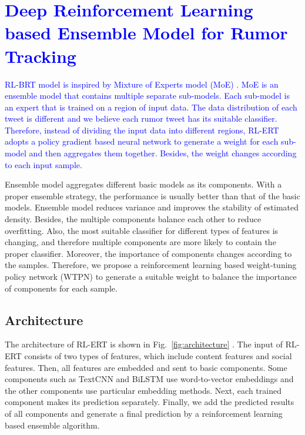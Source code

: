 \section{\textcolor{blue}{Deep Reinforcement Learning based Ensemble Model for Rumor Tracking}}
\label{sec:model}

\textcolor{blue}{RL-BRT model is inspired by Mixture of Experts model (MoE) \cite{DBLP:conf/nips/MillerU96}. MoE is an ensemble model that contains multiple separate sub-models. Each sub-model is an expert that is trained on a region of input data. The data distribution of each tweet is different and we believe each rumor tweet has its suitable classifier. Therefore, instead of dividing the input data into different regions, RL-ERT adopts a policy gradient based neural network to generate a weight for each sub-model and then aggregates them together. Besides, the weight changes according to each input sample.}

Ensemble model \cite{DBLP:journals/ml/Breiman96b} aggregates different basic models as its components. With a proper ensemble strategy, the performance is usually better than that of the basic models. Ensemble model reduces variance and improves the
stability of estimated density. Besides, the multiple components balance each other to reduce overfitting. Also, the most suitable classifier for different types of features is changing, and therefore multiple components are more likely to contain the proper classifier. Moreover, the importance of components changes according to the samples. Therefore, we propose a reinforcement learning based weight-tuning policy network (WTPN) to generate a suitable weight to balance the importance of components for each sample. 

\subsection{Architecture}
\label{sec:architecture}
The architecture of RL-ERT is shown in Fig.~\ref{fig:architecture} . The input of RL-ERT consists of two types of features, which include content features and social features. Then, all features are embedded and sent to basic components.  Some components such as TextCNN and BiLSTM use word-to-vector embeddings and the other components use particular embedding methods. Next, each trained component makes its prediction separately. Finally, we add the predicted results of all components and generate a final prediction by a reinforcement learning based ensemble algorithm.

